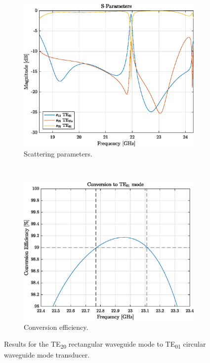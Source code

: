 \documentclass[english,twoside]{article}
\begin{document}
    \begin{figure}[H]
		\centering			
		\begin{subfigure}[b]{0.48\textwidth}
			\includegraphics[width=\textwidth]{figures/wrTE20ToWcTE01}
			\caption{Scattering parameters.}
		\end{subfigure}
		~
		\begin{subfigure}[b]{0.48\textwidth}
			\includegraphics[width=\textwidth]{figures/wrTE20ToWcTE01_eff}
			\caption{Conversion efficiency.}
		\end{subfigure}
		\caption{Results for the TE\textsubscript{20} rectangular waveguide mode to TE\textsubscript{01} circular waveguide mode transducer.}
		\label{fig:wrTE20ToWcTE01}
	\end{figure}
	
\end{document}
